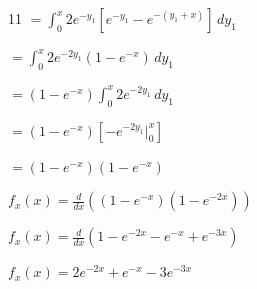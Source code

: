 \documentclass[12 pt]{article}
\begin{document}
\begin{exercise}{11}
    $= \int_{0}^{x} 2e^{-y_1} [e^{-y_1} - e^{-(y_1+x)}] \, dy_1$

    $= \int_{0}^{x} 2e^{-2y_1}(1-e^{-x}) \, dy_1$

    $= (1-e^{-x}) \int_{0}^{x} 2e^{-2y_1} \, dy_1$

    $= (1-e^{-x})[-e^{-2y_1} |_{0}^{x}]$

    $=(1-e^{-x})(1-e^{-x})$

    \hfill

    $f_x(x) = \frac{d}{dx}((1-e^{-x})(1-e^{-2x}))$

    $f_x(x) = \frac{d}{dx}(1 - e^{-2x} - e^{-x} + e^{-3x})$

    $f_x(x) = 2e^{-2x}+e^{-x} - 3e^{-3x}$

    \hfill
    \end{exercise}

   
\end{document}
